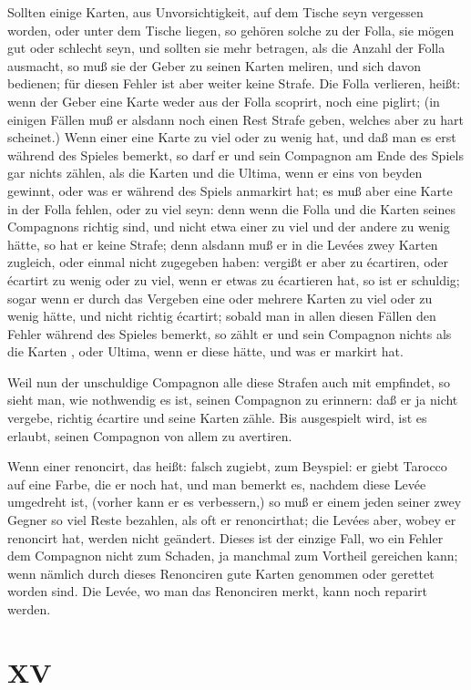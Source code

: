 \documentclass[11pt,a6paper,twoside]{article}
\begin{document}
Sollten einige Karten, aus Unvorsichtigkeit, auf dem Tische seyn vergessen worden, oder unter dem Tische liegen, so gehören solche zu der Folla, sie mögen gut oder schlecht seyn, und sollten sie mehr betragen, als die Anzahl der Folla ausmacht, so muß sie der Geber zu seinen Karten meliren, und sich davon bedienen; für diesen Fehler ist aber weiter keine Strafe. Die Folla verlieren, heißt: wenn der Geber eine Karte weder aus der Folla scoprirt, noch eine piglirt; (in einigen Fällen muß er alsdann noch einen Rest Strafe geben, welches aber zu hart scheinet.) Wenn einer eine Karte zu viel oder zu wenig hat, und daß man es erst während des Spieles bemerkt, so darf er und sein Compagnon am Ende des Spiels gar nichts zählen, als die Karten und die Ultima, wenn er eins von beyden gewinnt, oder was er während des Spiels anmarkirt hat; es muß aber eine Karte in der Folla fehlen, oder zu viel seyn: denn wenn die Folla und die Karten seines Compagnons richtig sind, und nicht etwa einer zu viel und der andere zu wenig hätte, so hat er keine Strafe; denn alsdann muß er in die Levées zwey Karten zugleich, oder einmal nicht zugegeben haben: vergißt er aber zu écartiren, oder écartirt zu wenig oder zu viel, wenn er etwas zu écartieren hat, so ist er schuldig; sogar wenn er durch das Vergeben eine oder mehrere Karten zu viel oder zu wenig hätte, und nicht richtig écartirt; sobald man in allen diesen Fällen den Fehler während des Spieles bemerkt, so zählt er und sein Compagnon nichts als die Karten , oder Ultima, wenn er diese hätte, und was er markirt hat.

Weil nun der unschuldige Compagnon alle diese Strafen auch mit empfindet, so sieht man, wie nothwendig es ist, seinen Compagnon zu erinnern: daß er ja nicht vergebe, richtig écartire und seine Karten zähle. Bis ausgespielt wird, ist es erlaubt, seinen Compagnon von allem zu avertiren.

Wenn einer renoncirt, das heißt: falsch zugiebt, zum Beyspiel: er giebt Tarocco auf eine Farbe, die er noch hat, und man bemerkt es, nachdem diese Levée umgedreht ist, (vorher kann er es verbessern,) so muß er einem jeden seiner zwey Gegner so viel Reste bezahlen, als oft er renoncirthat; die Levées aber, wobey er renoncirt hat, werden nicht geändert. Dieses ist der einzige Fall, wo ein Fehler dem Compagnon nicht zum Schaden, ja manchmal zum Vortheil gereichen kann; wenn nämlich durch dieses Renonciren gute Karten genommen oder gerettet worden sind. Die Levée, wo man das Renonciren merkt, kann noch reparirt werden.

\section{XV}
\end{document}
